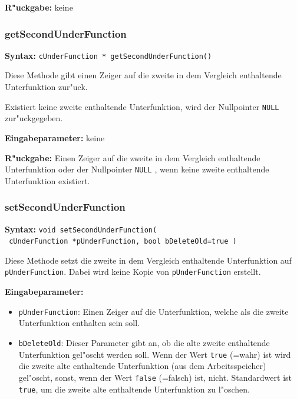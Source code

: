 \bigskip\noindent
\textbf{R"uckgabe:} keine


\subsubsection{getSecondUnderFunction}

\textbf{Syntax:} \verb|cUnderFunction * getSecondUnderFunction()|

\bigskip\noindent
Diese Methode gibt einen Zeiger auf die zweite in dem Vergleich enthaltende Unterfunktion zur"uck.

Existiert keine zweite enthaltende Unterfunktion, wird der Nullpointer \verb|NULL| zur"uckgegeben.

\bigskip\noindent
\textbf{Eingabeparameter:} keine

\bigskip\noindent
\textbf{R"uckgabe:} Einen Zeiger auf die zweite in dem Vergleich enthaltende Unterfunktion oder der Nullpointer \verb|NULL| , wenn keine zweite enthaltende Unterfunktion existiert.


\subsubsection{setSecondUnderFunction}

\textbf{Syntax:} \verb|void setSecondUnderFunction(| \\\verb| cUnderFunction *pUnderFunction, bool bDeleteOld=true )|

\bigskip\noindent
Diese Methode setzt die zweite in dem Vergleich enthaltende Unterfunktion auf \verb|pUnderFunction|. Dabei wird keine Kopie von \verb|pUnderFunction| erstellt.

\bigskip\noindent
\textbf{Eingabeparameter:}
\begin{itemize}
 \item \verb|pUnderFunction|: Einen Zeiger auf die Unterfunktion, welche als die zweite Unterfunktion enthalten sein soll.
 \item \verb|bDeleteOld|: Dieser Parameter gibt an, ob die alte zweite enthaltende Unterfunktion gel"oscht werden soll. Wenn der Wert \verb|true| (=wahr) ist wird die zweite alte enthaltende Unterfunktion (aus dem Arbeitsspeicher) gel"oscht, sonst, wenn der Wert \verb|false| (=falsch) ist, nicht. Standardwert ist \verb|true|, um die zweite alte enthaltende Unterfunktion zu l"oschen.
\end{itemize}

